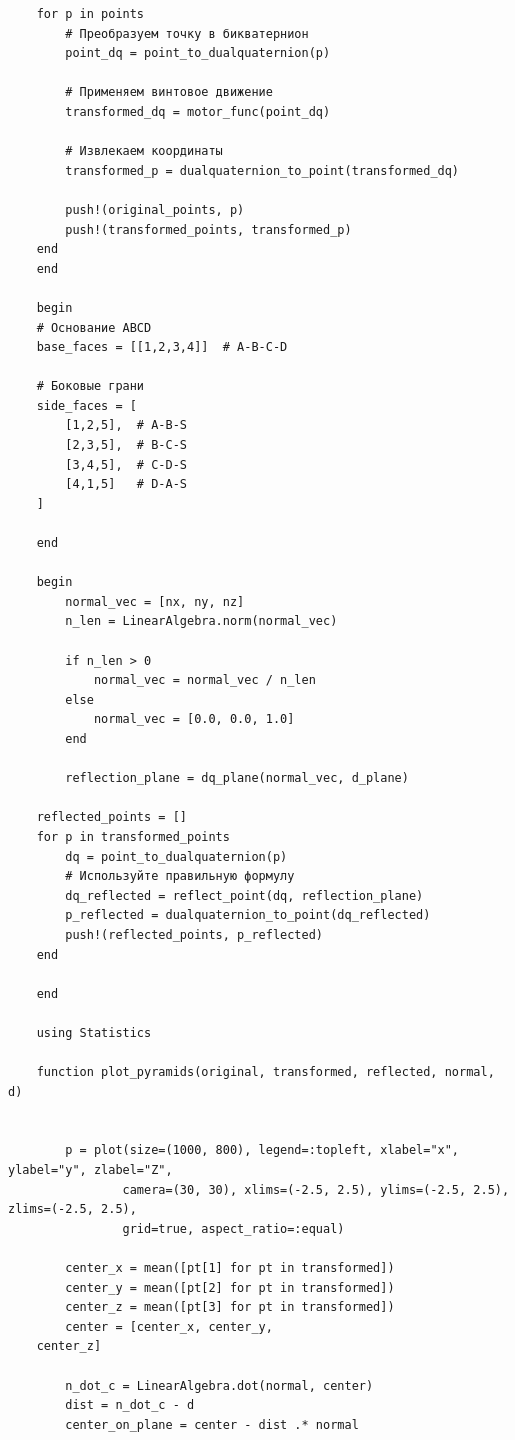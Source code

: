 \begin{verbatim}
    for p in points
        # Преобразуем точку в бикватернион
        point_dq = point_to_dualquaternion(p)
        
        # Применяем винтовое движение
        transformed_dq = motor_func(point_dq)
        
        # Извлекаем координаты
        transformed_p = dualquaternion_to_point(transformed_dq)
        
        push!(original_points, p)
        push!(transformed_points, transformed_p)
    end
    end

    begin
    # Основание ABCD
    base_faces = [[1,2,3,4]]  # A-B-C-D
    
    # Боковые грани
    side_faces = [
        [1,2,5],  # A-B-S
        [2,3,5],  # B-C-S  
        [3,4,5],  # C-D-S
        [4,1,5]   # D-A-S
    ]
    
    end

    begin
        normal_vec = [nx, ny, nz]
        n_len = LinearAlgebra.norm(normal_vec)
        
        if n_len > 0 
            normal_vec = normal_vec / n_len 
        else 
            normal_vec = [0.0, 0.0, 1.0] 
        end

        reflection_plane = dq_plane(normal_vec, d_plane)

    reflected_points = []
    for p in transformed_points
        dq = point_to_dualquaternion(p)
        # Используйте правильную формулу
        dq_reflected = reflect_point(dq, reflection_plane)
        p_reflected = dualquaternion_to_point(dq_reflected)
        push!(reflected_points, p_reflected)
    end
    
    end

    using Statistics

    function plot_pyramids(original, transformed, reflected, normal, d)

        
        p = plot(size=(1000, 800), legend=:topleft, xlabel="x", ylabel="y", zlabel="Z", 
                camera=(30, 30), xlims=(-2.5, 2.5), ylims=(-2.5, 2.5), zlims=(-2.5, 2.5),
                grid=true, aspect_ratio=:equal)

        center_x = mean([pt[1] for pt in transformed])
        center_y = mean([pt[2] for pt in transformed])
        center_z = mean([pt[3] for pt in transformed])
        center = [center_x, center_y,
    center_z]

        n_dot_c = LinearAlgebra.dot(normal, center)
        dist = n_dot_c - d
        center_on_plane = center - dist .* normal


\end{verbatim}
